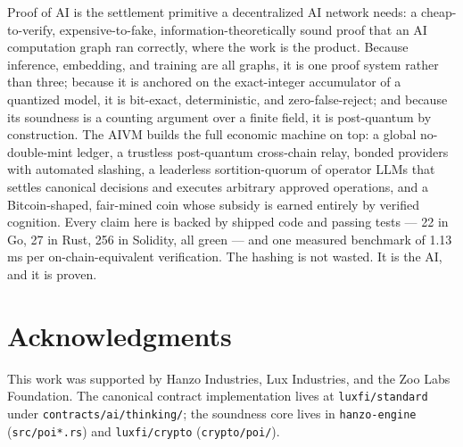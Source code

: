 \documentclass[11pt,a4paper]{article}
\begin{document}
Proof of AI is the settlement primitive a decentralized AI network needs: a cheap-to-verify, expensive-to-fake, information-theoretically sound proof that an AI computation graph ran correctly, where the work is the product. Because inference, embedding, and training are all graphs, it is one proof system rather than three; because it is anchored on the exact-integer accumulator of a quantized model, it is bit-exact, deterministic, and zero-false-reject; and because its soundness is a counting argument over a finite field, it is post-quantum by construction. The AIVM builds the full economic machine on top: a global no-double-mint ledger, a trustless post-quantum cross-chain relay, bonded providers with automated slashing, a leaderless sortition-quorum of operator LLMs that settles canonical decisions and executes arbitrary approved operations, and a Bitcoin-shaped, fair-mined coin whose subsidy is earned entirely by verified cognition. Every claim here is backed by shipped code and passing tests --- 22 in Go, 27 in Rust, 256 in Solidity, all green --- and one measured benchmark of 1.13\,ms per on-chain-equivalent verification. The hashing is not wasted. It is the AI, and it is proven.

\section*{Acknowledgments}

This work was supported by Hanzo Industries, Lux Industries, and the Zoo Labs Foundation. The canonical contract implementation lives at \texttt{luxfi/standard} under \texttt{contracts/ai/thinking/}; the soundness core lives in \texttt{hanzo-engine} (\texttt{src/poi*.rs}) and \texttt{luxfi/crypto} (\texttt{crypto/poi/}).
\end{document}

